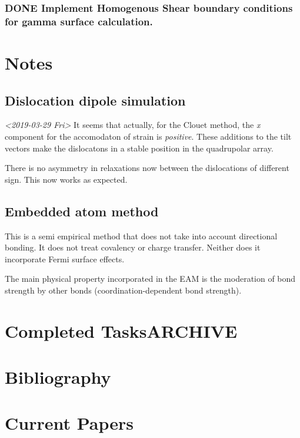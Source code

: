 \documentclass[11pt]{article}
\begin{document}
\subsubsection{{\bfseries\sffamily DONE} Implement Homogenous Shear boundary conditions for gamma surface calculation.}
\label{sec:org30db119}
\section{Notes}
\label{sec:orgf304a93}
\subsection{Dislocation dipole simulation}
\label{sec:org804f94f}

\textit{<2019-03-29 Fri>}
It seems that actually, for the Clouet method, the \emph{x} component for the
accomodaton of strain is \emph{positive}. These additions to the tilt vectors make
the dislocatons in a stable position in the quadrupolar array. 

There is no asymmetry in relaxations now between the dislocations of different
sign. This now works as expected. 




\subsection{Embedded atom method}
\label{sec:orga25c3e6}
This is a semi empirical method that does not take into account directional
bonding. It does not treat covalency or charge transfer. Neither does it
incorporate Fermi surface effects. 

The main physical property incorporated in the EAM is the moderation of bond
strength by other bonds (coordination-dependent bond strength).

\section{Completed Tasks\hfill{}\textsc{ARCHIVE}}
\label{sec:org2082c82}

\section{Bibliography}
\label{sec:orga525d4a}
\label{org937368d}




\section{Current Papers}
\label{sec:org35f3849}
\end{document}
